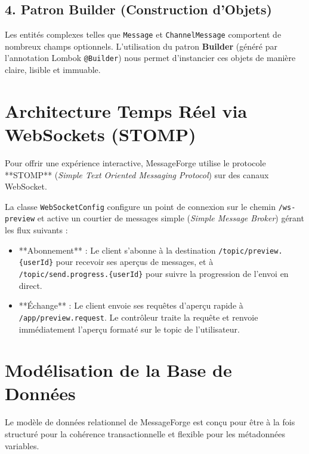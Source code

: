 \subsection{4. Patron Builder (Construction d'Objets)}
Les entités complexes telles que \texttt{Message} et \texttt{ChannelMessage} comportent de nombreux champs optionnels. L'utilisation du patron \textbf{Builder} (généré par l'annotation Lombok \texttt{@Builder}) nous permet d'instancier ces objets de manière claire, lisible et immuable.

\section{Architecture Temps Réel via WebSockets (STOMP)}

Pour offrir une expérience interactive, MessageForge utilise le protocole **STOMP** (\textit{Simple Text Oriented Messaging Protocol}) sur des canaux WebSocket. 

La classe \texttt{WebSocketConfig} configure un point de connexion sur le chemin \texttt{/ws-preview} et active un courtier de messages simple (\textit{Simple Message Broker}) gérant les flux suivants :
\begin{itemize}
    \item **Abonnement** : Le client s'abonne à la destination \texttt{/topic/preview.\{userId\}} pour recevoir ses aperçus de messages, et à \texttt{/topic/send.progress.\{userId\}} pour suivre la progression de l'envoi en direct.
    \item **Échange** : Le client envoie ses requêtes d'aperçu rapide à \texttt{/app/preview.request}. Le contrôleur traite la requête et renvoie immédiatement l'aperçu formaté sur le topic de l'utilisateur.
\end{itemize}

\section{Modélisation de la Base de Données}

Le modèle de données relationnel de MessageForge est conçu pour être à la fois structuré pour la cohérence transactionnelle et flexible pour les métadonnées variables.

